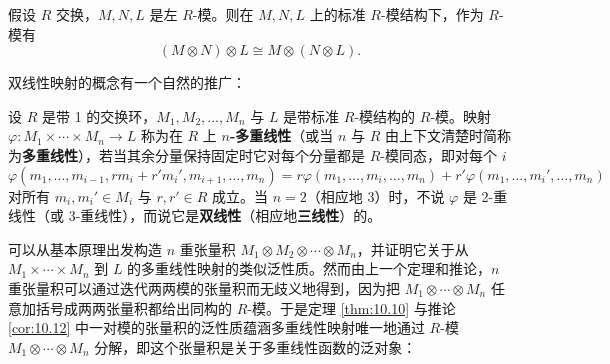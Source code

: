 \begin{corollary}\label{cor:10.15}
假设 \(R\) 交换，\(M, N, L\) 是左 \(R\)-模。则在 \(M, N, L\) 上的标准 \(R\)-模结构下，作为 \(R\)-模有
\[
(M \otimes N) \otimes L \cong M \otimes (N \otimes L).
\]
\end{corollary}

双线性映射的概念有一个自然的推广：

\begin{definition}
设 \(R\) 是带 1 的交换环，\(M_1, M_2, \ldots, M_n\) 与 \(L\) 是带标准 \(R\)-模结构的 \(R\)-模。映射 \(\varphi : M_1 \times \cdots \times M_n \to L\) 称为在 \(R\) 上 \textbf{\(n\)-多重线性}（或当 \(n\) 与 \(R\) 由上下文清楚时简称为\textbf{多重线性}），若当其余分量保持固定时它对每个分量都是 \(R\)-模同态，即对每个 \(i\)
\[
\varphi(m_1, \ldots, m_{i-1}, rm_i+r'm_i', m_{i+1}, \ldots, m_n) = r\varphi(m_1, \ldots, m_i, \ldots, m_n)+r'\varphi(m_1, \ldots, m_i', \ldots, m_n)
\]
对所有 \(m_i, m_i' \in M_i\) 与 \(r, r' \in R\) 成立。当 \(n = 2\)（相应地 3）时，不说 \(\varphi\) 是 2-重线性（或 3-重线性），而说它是\textbf{双线性}（相应地\textbf{三线性}）的。
\end{definition}

可以从基本原理出发构造 \(n\) 重张量积 \(M_1 \otimes M_2 \otimes \cdots \otimes M_n\)，并证明它关于从 \(M_1 \times \cdots \times M_n\) 到 \(L\) 的多重线性映射的类似泛性质。然而由上一个定理和推论，\(n\) 重张量积可以通过迭代两两模的张量积而无歧义地得到，因为把 \(M_1 \otimes \cdots \otimes M_n\) 任意加括号成两两张量积都给出同构的 \(R\)-模。于是定理 \ref{thm:10.10} 与推论 \ref{cor:10.12} 中一对模的张量积的泛性质蕴涵多重线性映射唯一地通过 \(R\)-模 \(M_1 \otimes \cdots \otimes M_n\) 分解，即这个张量积是关于多重线性函数的泛对象：

